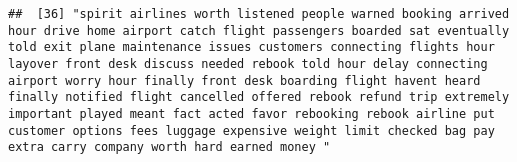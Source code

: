 \documentclass[
]{article}
\begin{document}
\begin{verbatim}
##  [36] "spirit airlines worth listened people warned booking arrived hour drive home airport catch flight passengers boarded sat eventually told exit plane maintenance issues customers connecting flights hour layover front desk discuss needed rebook told hour delay connecting airport worry hour finally front desk boarding flight havent heard finally notified flight cancelled offered rebook refund trip extremely important played meant fact acted favor rebooking rebook airline put customer options fees luggage expensive weight limit checked bag pay extra carry company worth hard earned money "                                                                                                                                                                                                                                                                                                                                                                                                                                                                                                                                                                                                                                                                                                                                                                                                                                                                                                                                                                                                                                                                                                                                                                                 

\end{verbatim}
\end{document}
